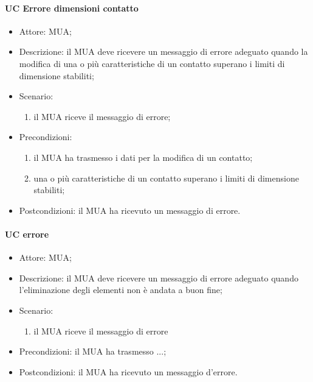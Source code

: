     \paragraph{UC Errore dimensioni contatto} \label{sec: UC 11.4.2.1}
    \begin{itemize}
        \item Attore: MUA;
        \item Descrizione: il MUA deve ricevere un messaggio di errore adeguato quando la modifica di una o più caratteristiche di un contatto superano i limiti di dimensione stabiliti;
        \item Scenario:
        \begin{enumerate}
        \item il MUA riceve il messaggio di errore;
        \end{enumerate}   
        \item Precondizioni: 
        \begin{enumerate}
            \item il MUA ha trasmesso i dati per la modifica di un contatto;
            \item una o più caratteristiche di un contatto superano i limiti di dimensione stabiliti;
        \end{enumerate}
        \item Postcondizioni: il MUA ha ricevuto un messaggio di errore.
    \end{itemize}




    \paragraph{UC  errore} \label{sec: UC 11.4.2.1}
    \begin{itemize}
        \item Attore: MUA;
        \item Descrizione: il MUA deve ricevere un messaggio di errore adeguato quando l'eliminazione degli elementi non è andata a buon fine;
        \item Scenario:
        \begin{enumerate}
        \item il MUA riceve il messaggio di errore
        \end{enumerate}   
        \item Precondizioni: il MUA ha trasmesso ...;
        \item Postcondizioni: il MUA ha ricevuto un messaggio d'errore.
    \end{itemize}


